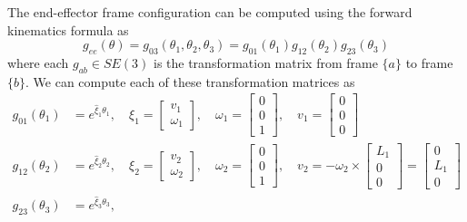 The end-effector frame configuration can be computed using the forward kinematics formula as
\begin{equation}
    g_{e e}(\theta)
    =
    g_{0 3}(\theta_{1}, \theta_{2}, \theta_{3})
    =
    g_{0 1}(\theta_{1}) g_{1 2}(\theta_{2}) g_{2 3}(\theta_{3})
\end{equation}
where each \( g_{a b} \in SE(3) \) is the transformation matrix from frame \( \{ a \} \) to frame \( \{ b \} \).
We can compute each of these transformation matrices as
\begin{align*}
    g_{0 1}(\theta_{1})
     & =
    e^{\widehat{\xi}_{1} \theta_{1}},
    \quad
    \xi_{1}
    =
    \begin{bmatrix}
        v_1 \\
        \omega_1
    \end{bmatrix},
    \quad
    \omega_1
    =
    \begin{bmatrix}
        0 \\
        0 \\
        1
    \end{bmatrix},
    \quad
    v_1
    =
    \begin{bmatrix}
        0 \\
        0 \\
        0
    \end{bmatrix}
    \\
    g_{1 2}(\theta_{2})
     & =
    e^{\widehat{\xi}_{2} \theta_{2}},
    \quad
    \xi_{2}
    =
    \begin{bmatrix}
        v_2 \\
        \omega_2
    \end{bmatrix},
    \quad
    \omega_2
    =
    \begin{bmatrix}
        0 \\
        0 \\
        1
    \end{bmatrix},
    \quad
    v_2
    =
    - \omega_2 \times
    \begin{bmatrix}
        L_1 \\
        0   \\
        0
    \end{bmatrix}
    =
    \begin{bmatrix}
        0   \\
        L_1 \\
        0
    \end{bmatrix}
    \\
    g_{2 3}(\theta_{3})
     & =
    e^{\widehat{\xi}_{3} \theta_{3}},

\end{align*}
